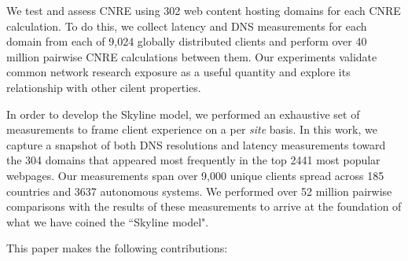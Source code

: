 We test and assess CNRE using 302 web content hosting domains for each CNRE
calculation.  To do this, we collect latency and DNS measurements for each
domain from each of 9,024 globally distributed clients and perform over 40
million pairwise CNRE calculations between them. Our experiments 
validate common network research exposure as a useful quantity and explore its
relationship with other cilent properties.


In order to develop the Skyline model, we performed an exhaustive set of measurements to frame
client experience on a per \emph{site} basis. In this work, we capture a
snapshot of both DNS resolutions and latency measurements toward the 304 domains that appeared most
frequently in the top 2441 most popular webpages. Our measurements span over
9,000 unique
clients spread across 185 countries and 3637 autonomous systems. We performed over 52 million pairwise
comparisons with the results of these measurements to arrive at the foundation of what we have
coined the ``Skyline model". 

This paper makes the following contributions: %

